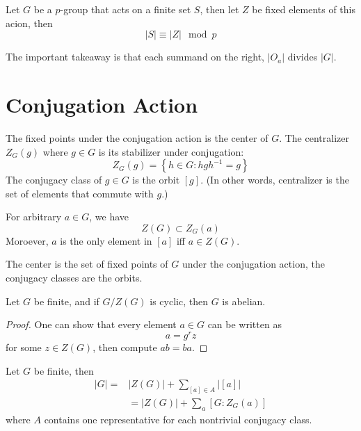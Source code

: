 \documentclass[openany]{book}
\begin{document}
\begin{prop}
    Let $G$ be a $p$-group that acts on a finite set $S$, then let $Z$ be fixed elements of this acion, then 
    \begin{equation*}
        |S|\equiv |Z|\mod p
    \end{equation*}
\end{prop}
\begin{warn}
    The important takeaway is that each summand on the right, $|O_a|$ divides $|G|$.
\end{warn}

\section{Conjugation Action}

\begin{defn}
    The fixed points under the conjugation action is the center of $G$.
    The centralizer $Z_G(g)$ where $g\in G$ is its stabilizer under conjugation:
    \begin{equation*}
        Z_G(g)=\left\{h\in G: hgh^{-1}=g\right\}
    \end{equation*}
    The conjugacy class of $g\in G$ is the orbit $[g]$. (In other words, centralizer is the set of elements that commute with $g$.)
\end{defn}
For arbitrary $a\in G$, we have 
\begin{equation*}
    Z(G)\subset Z_G(a)
\end{equation*}
Moroever, $a$ is the only element in $[a]$ iff $a\in Z(G)$.


\begin{prop}
    The center is the set of fixed points of $G$ under the conjugation action, the conjugacy classes are the orbits. 
\end{prop}

\begin{thm}
    Let $G$ be finite, and if $G/Z(G)$ is cyclic, then $G$ is abelian.
\end{thm}
\begin{proof}
    One can show that every element $a\in G$ can be written as 
    \begin{equation*}
        a=g^rz
    \end{equation*}
    for some $z\in Z(G)$, then compute $ab=ba$.
\end{proof}




\begin{prop}
    Let $G$ be finite, then 
    \begin{align*}
        |G|=&|Z(G)|+\sum_{[a]\in A}|[a]|\\
        &=|Z(G)|+\sum_a[G:Z_G(a)]
    \end{align*}
    where $A$ contains one representative for each nontrivial conjugacy class.
\end{prop}
\end{document}
